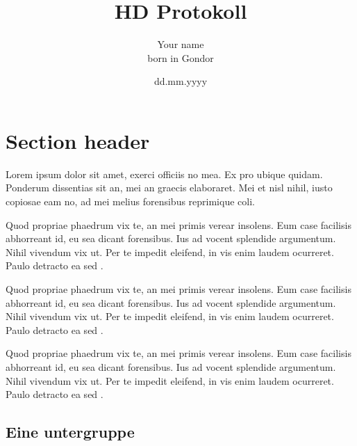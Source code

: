 \documentclass[%
 12pt,           %
 english,        %
 a4paper,        %
 DIV14,          %
 twoside,        %
 thesis,         %
 impberklaerung, %
 bachelor        %
]{hdthesis}   %
\title{HD Protokoll}
\author{Your name\\born in Gondor}
\date{dd.mm.yyyy}
\institute{free text}
\begin{document}
\maketitle                       %
\cleardoublepage                 %

\tableofcontents                 %

\newpage        			     %
\printglossaries                 %

\cleardoublepage                 %


\section{Section header}
Lorem ipsum dolor sit amet, exerci officiis no mea. Ex pro ubique quidam. Ponderum dissentias sit an, mei an graecis elaboraret. Mei et nisl nihil, iusto copiosae eam no, ad mei melius forensibus reprimique \gls{coli}.

Quod propriae phaedrum vix te, an mei primis verear insolens. Eum case facilisis abhorreant id, eu sea dicant forensibus. Ius ad vocent splendide argumentum. Nihil vivendum vix ut. Per te impedit eleifend, in vis enim laudem ocurreret. Paulo detracto ea sed \citep{hector1999plant}.

Quod propriae phaedrum vix te, an mei primis verear insolens. Eum case facilisis abhorreant id, eu sea dicant forensibus. Ius ad vocent splendide argumentum. Nihil vivendum vix ut. Per te impedit eleifend, in vis enim laudem ocurreret. Paulo detracto ea sed \citep{hector1999plant}.

Quod propriae phaedrum vix te, an mei primis verear insolens. Eum case facilisis abhorreant id, eu sea dicant forensibus. Ius ad vocent splendide argumentum. Nihil vivendum vix ut. Per te impedit eleifend, in vis enim laudem ocurreret. Paulo detracto ea sed \citep{hector1999plant}.

\subsection{Eine untergruppe}
\end{document}
